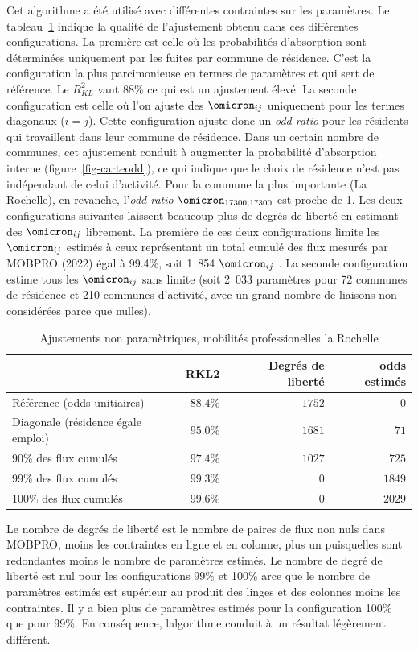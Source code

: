 \documentclass[
  10pt,
  a4paper,
  numbers=noendperiod,
  DIV=9]{scrartcl}
\begin{document}
Cet algorithme a été utilisé avec différentes contraintes sur les
paramètres. Le tableau~\ref{tbl-meapsR2-np} indique la qualité de
l'ajustement obtenu dans ces différentes configurations. La première est
celle où les probabilités d'absorption sont déterminées uniquement par
les fuites par commune de résidence. C'est la configuration la plus
parcimonieuse en termes de paramètres et qui sert de référence. Le
\(R^2_{KL}\) vaut 88\% ce qui est un ajustement élevé. La seconde
configuration est celle où l'on ajuste des \(\omicron_{ij}\) uniquement
pour les termes diagonaux (\(i=j\)). Cette configuration ajuste donc un
\emph{odd-ratio} pour les résidents qui travaillent dans leur commune de
résidence. Dans un certain nombre de communes, cet ajustement conduit à
augmenter la probabilité d'absorption interne
(figure~\ref{fig-carteodd}), ce qui indique que le choix de résidence
n'est pas indépendant de celui d'activité. Pour la commune la plus
importante (La Rochelle), en revanche, l'\emph{odd-ratio}
\(\omicron_{17300, 17300}\) est proche de 1. Les deux configurations
suivantes laissent beaucoup plus de degrés de liberté en estimant des
\(\omicron_{ij}\) librement. La première de ces deux configurations
limite les \(\omicron_{ij}\) estimés à ceux représentant un total cumulé
des flux mesurés par MOBPRO (2022) égal à 99.4\%, soit 1~854
\(\omicron_{ij}\) . La seconde configuration estime tous les
\(\omicron_{ij}\) sans limite (soit 2~033 paramètres pour 72 communes de
résidence et 210 communes d'activité, avec un grand nombre de liaisons
non considérées parce que nulles).

\hypertarget{tbl-meapsR2-np}{}
\setlength{\LTpost}{0mm}
\begin{longtable}{lrrr}
\caption{\label{tbl-meapsR2-np}Ajustements non paramètriques, mobilités professionelles la Rochelle }\tabularnewline

\toprule
 & RKL2 & Degrés de liberté & odds estimés \\ 
\midrule
Référence (odds unitiaires) & $88.4\%$ & $1 752$ & $0$ \\ 
Diagonale (résidence égale emploi) & $95.0\%$ & $1 681$ & $71$ \\ 
90\% des flux cumulés & $97.4\%$ & $1 027$ & $725$ \\ 
99\% des flux cumulés  & $99.3\%$ & $0$ & $1 849$ \\ 
100\% des flux cumulés & $99.6\%$ & $0$ & $2 029$ \\ 
\bottomrule
\end{longtable}
\begin{minipage}{\linewidth}
Le nombre de degrés de liberté est le nombre de paires de flux non nuls dans MOBPRO, moins les contraintes en ligne et en colonne, plus un puisqu\textquotesingle{}elles sont redondantes moins le nombre de paramètres estimés. Le nombre de degré de liberté est nul pour les configurations 99\% et 100\% arce que le nombre de paramètres estimés est supérieur au produit des linges et des colonnes moins les contraintes. Il y a bien plus de paramètres estimés pour la configuration 100\%  que pour 99\%. En conséquence, l\textquotesingle{}algorithme conduit à un résultat légèrement différent.\\
\end{minipage}
\end{document}
